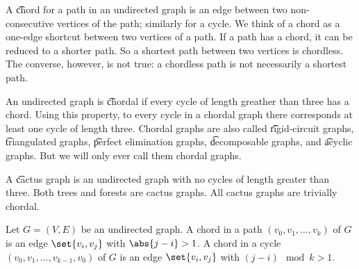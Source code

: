 
\sbasic































\sstart
{}


A \t{chord} for a path in an undirected graph is an edge between two non-consecutive vertices of the path; similarly for a cycle.
We think of a chord as a one-edge shortcut between two vertices of a path.
If a path has a chord, it can be reduced to a shorter path.
So a shortest path between two vertices is chordless.
The converse, however, is not true: a chordless path is not necessarily a shortest path.

An undirected graph is \t{chordal} if every cycle of length greather than three has a chord.
Using this property, to every cycle in a chordal graph there corresponds at least one cycle of length three.
Chordal graphs are also called \t{rigid-circuit graphs}, \t{triangulated graphs}, \t{perfect elimination graphs}, \t{decomposable graphs}, and \t{acyclic graphs}.
But we will only ever call them chordal graphs.

A \t{cactus graph} is an undirected graph with no cycles of length greater than three.
Both trees and forests are cactus graphs.
All cactus graphs are trivially chordal.



Let $G = (V, E)$ be an undirected graph.
A chord in a path $(v_0, v_1, \dots, v_k)$ of $G$ is an edge $\set{v_i, v_j}$ with $\abs{j - i} > 1$.
A chord in a cycle $(v_0, v_1, \dots, v_{k-1}, v_0)$ of $G$ is an edge $\set{v_i, v_j}$ with $(j - i) \mod k > 1$.

